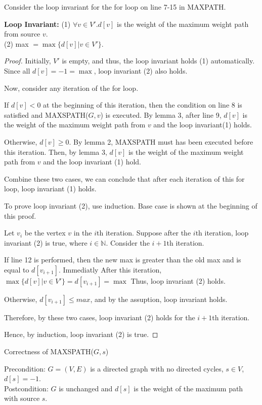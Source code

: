 \documentclass[10pt]{article}
\begin{document}
Consider the loop invariant for the for loop on line 7-15 in MAXPATH.

\textbf{Loop Invariant:} 
	(1) $\forall v \in V'. d[v]$ is the weight of the maximum weight path from
	source $v$.\\ 
	(2) max $= \max\{d[v] | v \in V'\}$.

\begin{proof}
	Initially, $V'$ is empty, and thus, the loop invariant holds (1) automatically.
	Since all $d[v] = -1 = \max$, loop invariant (2) also holds. 

	Now, consider any iteration of the for loop.

	If $d[v] < 0$ at the beginning of this iteration, then the condition on
	line 8 is satisfied and MAXSPATH($G, v$) is executed. 
	By lemma 3, after line 9, $d[v]$ is the weight of the maximum weight path
	from $v$ and the loop invariant(1) holds.
	
	Otherwise, $d[v] \geq 0$. 
	By lemma 2, MAXSPATH must has been executed before this iteration.
	Then, by lemma 3, $d[v]$ is the weight of the maximum weight path from $v$
	and the loop invariant (1) hold.

	Combine these two cases, we can conclude that after each iteration of this
	for loop, loop invariant (1) holds. 

	To prove loop invariant (2), use induction.
	Base case is shown at the beginning of this proof. 

	Let $v_i$ be the vertex $v$ in the $i$th iteration.
	Suppose after the $i$th iteration, loop invariant (2) is true, where $i \in
	\mathbb{N}$.
	Consider the $i+1$th iteration. 

	If line 12 is performed, then the new max is greater than the old max and
	is equal to $d[v_{i+1}]$.
	Immediatly After this iteration, $\max\{d[v] | v \in V'\} = d[v_{i+1}]
	= \max$
	Thus, loop invariant (2) holds.

	Otherwise, $d[v_{i+1}] \leq max$, and by the assuption, loop invariant
	holds. 

	Therefore, by these two cases, loop invariant (2) holds for the $i+1$th
	iteration. 

	Hence, by induction, loop invariant (2) is true.
\end{proof}

Correctness of MAXSPATH($G,s$)

Precondition: $G=(V,E)$ is a directed graph with no directed cycles, $s \in V$,
$d[s] = -1$. \\
Postcondition: $G$ is unchanged and $d[s]$ is the weight of the maximum path
with source $s$.
\end{document}
